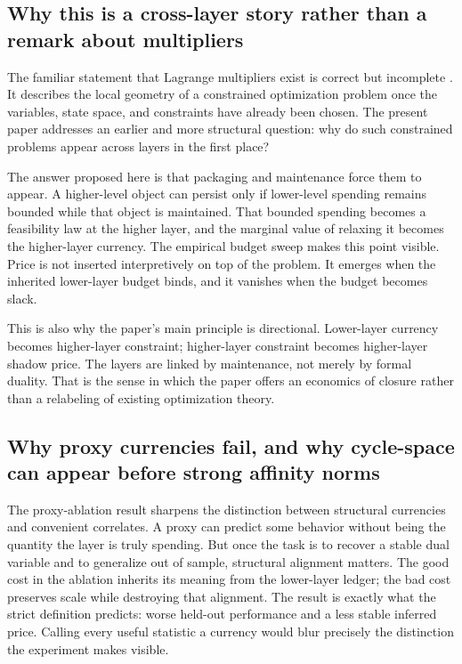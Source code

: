 \documentclass[11pt,a4paper]{article}
\begin{document}
\subsection{Why this is a cross-layer story rather than a remark about multipliers}

The familiar statement that Lagrange multipliers exist is correct but incomplete \cite{boyd2004convex}. It describes the local geometry of a constrained optimization problem once the variables, state space, and constraints have already been chosen. The present paper addresses an earlier and more structural question: why do such constrained problems appear across layers in the first place?

The answer proposed here is that packaging and maintenance force them to appear. A higher-level object can persist only if lower-level spending remains bounded while that object is maintained. That bounded spending becomes a feasibility law at the higher layer, and the marginal value of relaxing it becomes the higher-layer currency. The empirical budget sweep makes this point visible. Price is not inserted interpretively on top of the problem. It emerges when the inherited lower-layer budget binds, and it vanishes when the budget becomes slack.

This is also why the paper's main principle is directional. Lower-layer currency becomes higher-layer constraint; higher-layer constraint becomes higher-layer shadow price. The layers are linked by maintenance, not merely by formal duality. That is the sense in which the paper offers an economics of closure rather than a relabeling of existing optimization theory.

\subsection{Why proxy currencies fail, and why cycle-space can appear before strong affinity norms}

The proxy-ablation result sharpens the distinction between structural currencies and convenient correlates. A proxy can predict some behavior without being the quantity the layer is truly spending. But once the task is to recover a stable dual variable and to generalize out of sample, structural alignment matters. The good cost in the ablation inherits its meaning from the lower-layer ledger; the bad cost preserves scale while destroying that alignment. The result is exactly what the strict definition predicts: worse held-out performance and a less stable inferred price. Calling every useful statistic a currency would blur precisely the distinction the experiment makes visible.
\end{document}
